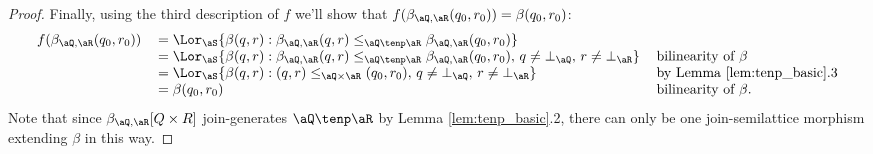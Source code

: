 \documentclass{article}
\begin{document}
\begin{proof}
\smallskip
Finally, using the third description of $f$ we'll show that $f(\beta_{\aQ,\aR}(q_0,r_0)) = \beta(q_0,r_0)$:
\[
\begin{tabular}{lll}
$f(\beta_{\aQ,\aR}(q_0,r_0))$
&
$= \Lor_\aS \{ \beta(q,r) : \beta_{\aQ,\aR}(q,r) \leq_{\aQ \tenp \aR} \beta_{\aQ,\aR}(q_0,r_0) \}$
\\&
$= \Lor_\aS \{ \beta(q,r) : \beta_{\aQ,\aR}(q,r) \leq_{\aQ \tenp \aR} \beta_{\aQ,\aR}(q_0,r_0), \, q \neq \bot_\aQ, \, r \neq \bot_\aR \}$
& bilinearity of $\beta$
\\&
$= \Lor_\aS \{ \beta(q,r) : (q,r) \leq_{\aQ \times \aR} (q_0,r_0),  \, q \neq \bot_\aQ, \, r \neq \bot_\aR \}$
& by Lemma \ref{lem:tenp_basic}.3
\\&
$= \beta(q_0,r_0)$
& bilinearity of $\beta$.
\end{tabular}
\]
Note that since $\beta_{\aQ,\aR}[Q \times R]$ join-generates $\aQ \tenp \aR$ by Lemma \ref{lem:tenp_basic}.2, there can only be one join-semilattice morphism extending $\beta$ in this way.
\end{proof}
\end{document}
